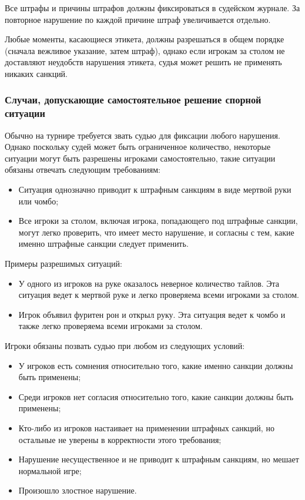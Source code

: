 Все штрафы и причины штрафов должны фиксироваться в судейском журнале. За повторное нарушение по каждой причине штраф увеличивается отдельно.

Любые моменты, касающиеся этикета, должны разрешаться в общем порядке (сначала вежливое указание, затем штраф), однако если игрокам за столом не доставляют неудобств нарушения этикета, судья может решить не применять никаких санкций.

\subsubsection{Случаи, допускающие самостоятельное решение спорной ситуации}

Обычно на турнире требуется звать судью для фиксации любого нарушения. Однако поскольку судей может быть ограниченное количество, некоторые ситуации могут быть разрешены игроками самостоятельно, такие ситуации обязаны отвечать следующим требованиям:
\begin{itemize}
	\item Ситуация однозначно приводит к штрафным санкциям в виде мертвой руки или чомбо;
	\item Все игроки за столом, включая игрока, попадающего под штрафные санкции, могут легко проверить, что имеет место нарушение, и согласны с тем, какие именно штрафные санкции следует применить.
\end{itemize}

Примеры разрешимых ситуаций:
\begin{itemize}
	\item У одного из игроков на руке оказалось неверное количество тайлов. Эта ситуация ведет к мертвой руке и легко проверяема всеми игроками за столом.
	\item Игрок объявил фуритен рон и открыл руку. Эта ситуация ведет к чомбо и также легко проверяема всеми игроками за столом.
\end{itemize}

Игроки обязаны позвать судью при любом из следующих условий:
\begin{itemize}
	\item У игроков есть сомнения относительно того, какие именно санкции должны быть применены;
	\item Среди игроков нет согласия относительно того, какие санкции должны быть применены;
	\item Кто-либо из игроков настаивает на применении штрафных санкций, но остальные не уверены в корректности этого требования;
	\item Нарушение несущественное и не приводит к штрафным санкциям, но мешает нормальной игре;
	\item Произошло злостное нарушение.
\end{itemize}

